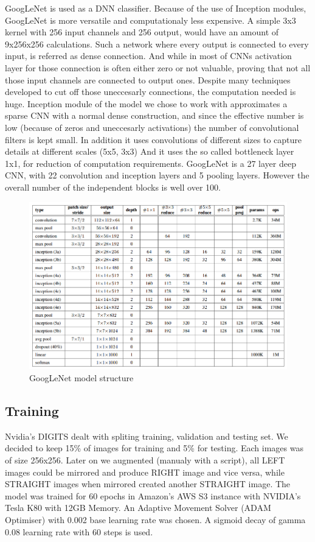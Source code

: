 \documentclass[10pt,jaurnal,compsoc]{IEEEtran}
\begin{document}
GoogLeNet is used as a DNN classifier. Because of the use of Inception modules, GoogLeNet is more versatile and computationaly less expensive. A simple 3x3 kernel with 256 input channels and 256 output, would have an amount of 9x256x256 calculations. Such a network where every output is connected to every input, is referred as dense connection. And while in most of CNNs activation layer for those connection is often either zero or not valuable, proving that not all those input channels are connected to output ones. Despite many techniques developed to cut off those uneccesarly connections, the computation needed is huge. Inception module of the model we chose to work with approximates a sparse CNN with a normal dense construction, and since the effective number is low (because of zeros and uneccesarly activations) the number of convolutional filters is kept small. In addition it uses convolutions of different sizes to capture details at different scales (5x5, 3x3) And it uses the so called bottleneck layer 1x1, for reduction of computation requirements.
GoogLeNet is a 27 layer deep CNN, with 22 convolution and inception layers and 5 pooling layers. However the overall number of the independent blocks is well over 100.

\begin{figure}[thpb]
    \centering
      \includegraphics[width=\linewidth]{googlenet}
      \caption{GoogLeNet model structure}
      \label{fig:robot1}
\end{figure}

\subsection{Training}
Nvidia's DIGITS dealt with spliting training, validation and testing set. We decided to keep 15\% of images for training and 5\% for testing. Each images was of size 256x256. Later on we augmented (manualy with a script), all LEFT images could be mirrored and produce RIGHT image and vice versa, while STRAIGHT images when mirrored created another STRAIGHT image. The model was trained for 60 epochs in Amazon's AWS S3 instance with NVIDIA's Tesla K80 with 12GB Memory. An Adaptive Movement Solver (ADAM Optimiser) with 0.002 base learning rate was chosen. A sigmoid decay of gamma 0.08 learning rate with 60 steps is used.
\end{document}
